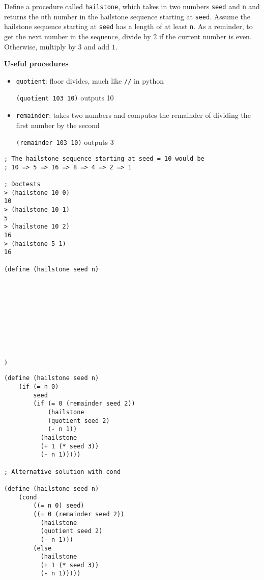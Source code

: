 \begin{blocksection}
\question Define a procedure called \lstinline$hailstone$,
which takes in two numbers \lstinline$seed$ and \lstinline$n$ and returns the
\lstinline$n$th number in the hailstone sequence starting at \lstinline$seed$.
Assume the hailstone sequence starting at \lstinline$seed$ has a length of at least
\lstinline$n$. As a reminder, to get the next number in the sequence, divide by $2$ if the current number is even. Otherwise, multiply by $3$ and add $1$.

\textbf{Useful procedures}

\begin{itemize}
\item \lstinline$quotient$: floor divides, much like \lstinline$//$ in python

\lstinline$(quotient 103 10)$ outputs 10

\item \lstinline$remainder$: takes two numbers and computes the remainder of dividing the first number by the second

\lstinline$(remainder 103 10)$ outputs 3
\end{itemize}

\vspace{\baselineskip}
\begin{lstlisting}
; The hailstone sequence starting at seed = 10 would be
; 10 => 5 => 16 => 8 => 4 => 2 => 1

; Doctests
> (hailstone 10 0)
10
> (hailstone 10 1)
5
> (hailstone 10 2)
16
> (hailstone 5 1)
16

(define (hailstone seed n)










)
\end{lstlisting}
\end{blocksection}

\begin{solution}[-32pt]
\begin{blocksection}
\begin{lstlisting}
(define (hailstone seed n)
    (if (= n 0)
        seed
        (if (= 0 (remainder seed 2))
            (hailstone
            (quotient seed 2)
            (- n 1))
          (hailstone
          (+ 1 (* seed 3))
          (- n 1)))))

; Alternative solution with cond

(define (hailstone seed n)
    (cond 
        ((= n 0) seed)
        ((= 0 (remainder seed 2))
          (hailstone
          (quotient seed 2)
          (- n 1)))
        (else 
          (hailstone
          (+ 1 (* seed 3))
          (- n 1)))))
\end{lstlisting}
\end{blocksection}
\end{solution}



